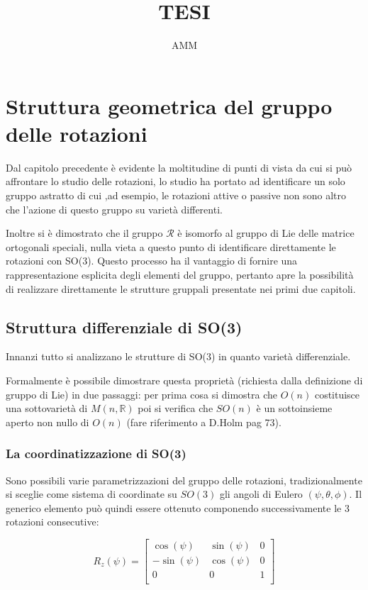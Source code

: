 \documentclass[11pt]{report}
\title{TESI}
\author{AMM}
\theoremstyle{plain}
\theoremstyle{definition}
\theoremstyle{remark}
\begin{document}
\maketitle

\chapter{Struttura geometrica del gruppo delle rotazioni}
Dal capitolo precedente è evidente la moltitudine di punti di vista da cui si può affrontare lo studio delle rotazioni, lo studio ha portato ad identificare un solo gruppo astratto di cui ,ad esempio, le rotazioni attive o passive non sono altro che l'azione di questo gruppo su varietà differenti.

Inoltre si è dimostrato che il gruppo $\mathscr{R}$ è isomorfo al gruppo di Lie delle matrice ortogonali speciali, nulla vieta a questo punto di identificare direttamente le rotazioni con SO(3). Questo processo ha il vantaggio di fornire una rappresentazione esplicita degli elementi del gruppo, pertanto apre la possibilità di realizzare direttamente le strutture gruppali presentate nei primi due capitoli.

\section{Struttura differenziale di SO(3)}
Innanzi tutto si analizzano le strutture di SO(3) in quanto varietà differenziale. 

Formalmente è possibile dimostrare questa proprietà (richiesta dalla definizione di gruppo di Lie) in due passaggi: per prima cosa si dimostra che $O(n)$ costituisce una sottovarietà di $M(n,\mathbb{R})$ poi si verifica che $SO(n)$ è un sottoinsieme aperto non nullo di $O(n)$ (fare riferimento a D.Holm pag 73).
  
\subsection{La coordinatizzazione di SO(3)}
Sono possibili varie parametrizzazioni del gruppo delle rotazioni, tradizionalmente si sceglie come sistema di coordinate su $SO(3)$ gli angoli di Eulero $(\psi, \theta, \phi)$.
Il generico elemento può quindi essere ottenuto componendo successivamente le 3 rotazioni consecutive:

\begin{displaymath}
R_{z}(\psi) = \left[ \begin{array}{ccc}
\cos(\psi) & \sin(\psi) & 0  \\
-\sin(\psi) & \cos(\psi) & 0  \\
0 & 0 & 1 \\
\end{array} \right]
\end{displaymath}	
\end{document}
